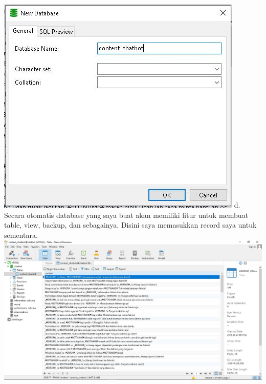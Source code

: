 \documentclass{article}
\begin{document}
\begin{enumerate}
        \includegraphics[scale=0.6]{26.5c.jpg}
        \newline
        d. Secara otomatis database yang  saya buat akan memiliki fitur untuk membuat table, view, backup, dan sebagainya. Disini saya memasukkan record saya untuk sementara.
        \newline
        \includegraphics[scale=0.3]{26.5d.jpg}
        \newline
        \seti %
    \end{enumerate}
\end{document}

